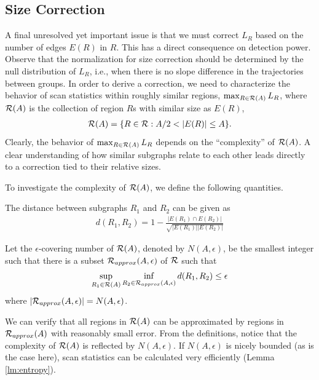 \subsection{Size Correction}
A final unresolved yet important issue is that we must correct $L_R$ based on the number of edges $E(R)$ in $R$.
This has a direct consequence on detection power.
Observe that the normalization for size correction should be determined by the null distribution of $L_R$, i.e., 
when there is no slope difference in the trajectories between groups.
In order to derive a correction, we need to characterize the behavior of scan statistics within roughly similar regions, $\max_{R\in \mathcal{R}(A)}L_R$, 
where $\mathcal{R}(A)$ is the collection of region $R$s with similar size as $E(R)$,
\begin{align}
\cR(A)=\{R\in \cR:A/2<|E(R)|\le A\}.
\end{align}
Clearly, the behavior of $\max_{R\in \mathcal{R}(A)}L_R$ depends on the ``complexity'' of $\mathcal{R}(A)$. 
A clear understanding of how similar subgraphs relate to each other leads directly to a correction tied to their relative sizes.

To investigate the complexity of $\mathcal{R}(A)$, we define the following quantities.
\begin{definition} The distance between subgraphs $R_1$ and $R_2$ can be given as
{\begin{align}
d(R_1,R_2)=1-\frac{|E(R_1)\cap E(R_2)|}{ \sqrt{|E(R_1)||E(R_2)|}}
\end{align}}
\end{definition}
\begin{definition}
Let the $\epsilon$-covering number of $\mathcal{R}(A)$, denoted by $N(A,\epsilon)$, be the smallest integer such that there
is a subset $\mathcal{R}_{approx}(A,\epsilon)$ of $\mathcal{R}$ such that
{\begin{align}
\sup_{R_{1}\in\mathcal{R}(A)}\inf_{R_{2}\in \mathcal{R}_{approx}(A,\epsilon)}d(R_{1},R_{2})\le \epsilon
\end{align}}
where $|\mathcal{R}_{approx}(A,\epsilon)|=N(A,\epsilon)$.
\end{definition}
We can verify that all regions in $\mathcal{R}(A)$
can be approximated by regions in $\mathcal{R}_{approx}(A)$ with reasonably small error.
From the definitions, notice that the complexity of $\mathcal{R}(A)$ is reflected by $N(A,\epsilon)$.
If $N(A,\epsilon)$ is nicely bounded (as is the case here), scan statistics can be calculated very efficiently 
(Lemma \ref{lm:entropy}). 

